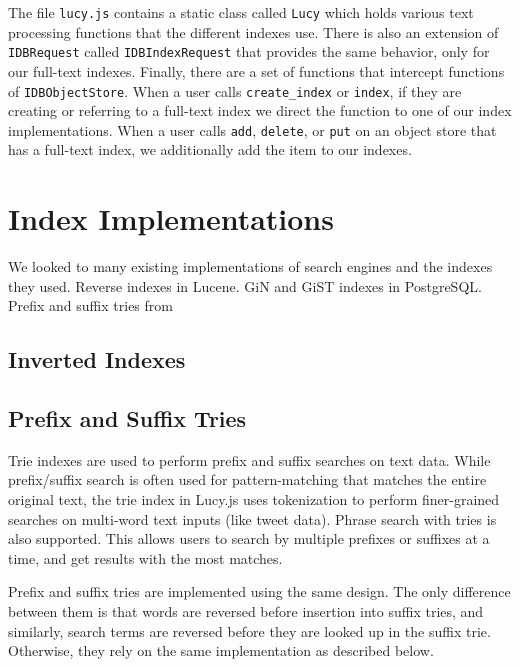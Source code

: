 \documentclass{vldb}
\begin{document}
The file \texttt{lucy.js} contains a static class called \texttt{Lucy} which holds various text processing functions that the different indexes use. There is also an extension of \texttt{IDBRequest} called \texttt{IDBIndexRequest} that provides the same behavior, only for our full-text indexes. Finally, there are a set of functions that intercept functions of \texttt{IDBObjectStore}. When a user calls \texttt{create\_index} or \texttt{index}, if they are creating or referring to a full-text index we direct the function to one of our index implementations. When a user calls \texttt{add},  \texttt{delete}, or \texttt{put} on an object store that has a full-text index, we additionally add the item to our indexes.






\section{Index Implementations}

We looked to many existing implementations of search engines and the indexes they used. Reverse indexes in Lucene. GiN and GiST indexes in PostgreSQL. Prefix and suffix tries from 

\subsection{Inverted Indexes}

\subsection{Prefix and Suffix Tries}

Trie indexes are used to perform prefix and suffix searches on text data. While prefix/suffix search is often used for pattern-matching that matches the entire original text, the trie index in Lucy.js uses tokenization to perform finer-grained searches on multi-word text inputs (like tweet data). Phrase search with tries is also supported. This allows users to search by multiple prefixes or suffixes at a time, and get results with the most matches.

Prefix and suffix tries are implemented using the same design. The only difference between them is that words are reversed before insertion into suffix tries, and similarly, search terms are reversed before they are looked up in the suffix trie. Otherwise, they rely on the same implementation as described below.
\end{document}
